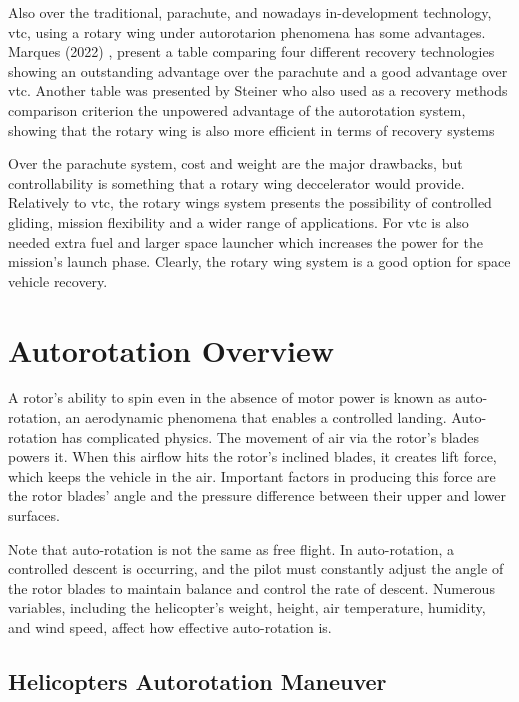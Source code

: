 Also over the traditional, parachute, and nowadays in-development technology, \gls{vtc}, using a rotary wing under autorotarion phenomena has some advantages. Marques (2022) \cite{marques_rocket_2022}, present a table comparing four different recovery technologies showing an outstanding advantage over the parachute and a good advantage over \gls{vtc}. Another table was presented by Steiner \cite{steiner_rotary_nodate} who also used as a recovery methods comparison criterion the unpowered advantage of the autorotation system, showing that the rotary wing is also more efficient in terms of recovery systems


Over the parachute system, cost and weight are the major drawbacks, but controllability is something that a rotary wing deccelerator would provide. Relatively to \gls{vtc}, the rotary wings system presents the possibility of controlled gliding, mission flexibility and a wider range of applications. For \gls{vtc} is also needed extra fuel and larger space launcher which increases the power for the mission's launch phase. Clearly, the rotary wing system is a good option for space vehicle recovery.

\section{Autorotation Overview}
\label{section:overview}

A rotor's ability to spin even in the absence of motor power is known as auto-rotation, an aerodynamic phenomena that enables a controlled landing. Auto-rotation has complicated physics. The movement of air via the rotor's blades powers it. When this airflow hits the rotor's inclined blades, it creates lift force, which keeps the vehicle in the air. Important factors in producing this force are the rotor blades' angle and the pressure difference between their upper and lower surfaces.

Note that auto-rotation is not the same as free flight. In auto-rotation, a controlled descent is occurring, and the pilot must constantly adjust the angle of the rotor blades to maintain balance and control the rate of descent. Numerous variables, including the helicopter's weight, height, air temperature, humidity, and wind speed, affect how effective auto-rotation is.


\subsection{Helicopters Autorotation Maneuver}

